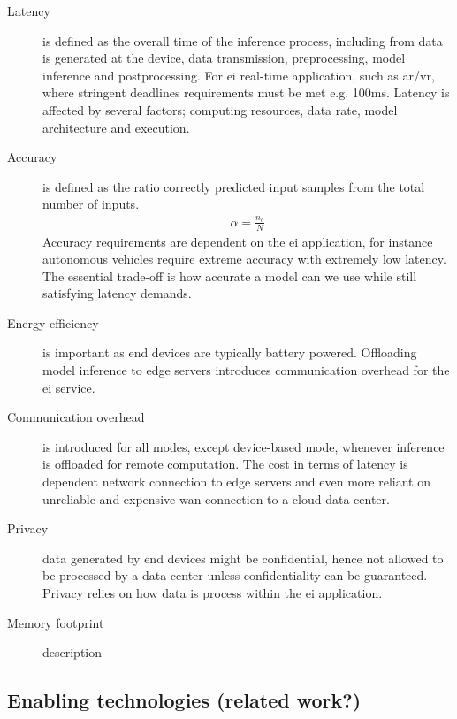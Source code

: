 \begin{description}
	\item[Latency] is defined as the overall time of the inference process, including from data is generated at the device, data transmission, preprocessing, model inference and postprocessing. For \gls{ei} real-time application, such as \gls{ar}/\gls{vr}, where stringent deadlines requirements must be met e.g. 100ms. Latency is affected by several factors; computing resources, data rate, model architecture and execution.
	\item[Accuracy] is defined as the ratio correctly predicted input samples from the total number of inputs. 
	\begin{align*}
		\alpha = \frac{n_c}{N}
	\end{align*}
	Accuracy requirements are dependent on the \gls{ei} application, for instance autonomous vehicles require extreme accuracy with extremely low latency. The essential trade-off is how accurate a model can we use while still satisfying latency demands.  
	\item[Energy efficiency] is important as end devices are typically battery powered. Offloading model inference to edge servers introduces communication overhead for the \gls{ei} service.
	\item[Communication overhead] is introduced for all modes, except device-based mode, whenever inference is offloaded for remote computation. The cost in terms of latency is dependent network connection to edge servers and even more reliant on unreliable and expensive \gls{wan} connection to a cloud data center. 
	\item[Privacy] data generated by end devices might be confidential, hence not allowed to be processed by a data center unless confidentiality can be guaranteed. Privacy relies on how data is process within the \gls{ei} application.  
	
	\item[Memory footprint] description
\end{description}

\subsection{Enabling technologies (related work?)}